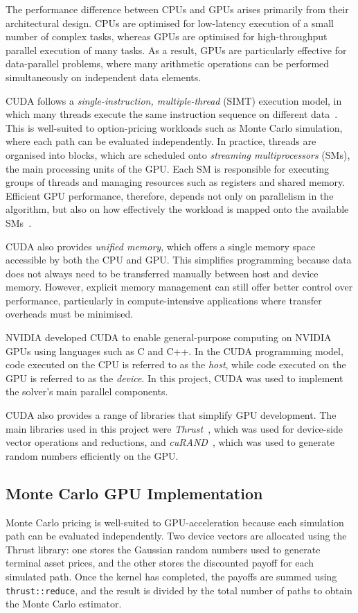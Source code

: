 \documentclass[11pt]{report}
\begin{document}
The performance difference between CPUs and GPUs arises primarily from their architectural design. 
CPUs are optimised for low-latency execution of a small number of complex tasks, 
whereas GPUs are optimised for high-throughput parallel execution of many tasks. 
As a result, GPUs are particularly effective for data-parallel problems, 
where many arithmetic operations can be performed simultaneously on independent data elements.

CUDA follows a \textit{single-instruction, multiple-thread} (SIMT) execution model, 
in which many threads execute the same instruction sequence on different data~\cite{5446251}. 
This is well-suited to option-pricing workloads such as Monte Carlo simulation, 
where each path can be evaluated independently. In practice, threads are organised into blocks,
which are scheduled onto \textit{streaming multiprocessors} (SMs), the main processing units of the GPU.
Each SM is responsible for executing groups of threads and managing resources such as registers and shared memory. 
Efficient GPU performance, therefore, depends not only on parallelism in the algorithm, 
but also on how effectively the workload is mapped onto the available SMs~\cite{4626815}.

CUDA also provides \textit{unified memory}, which offers a
single memory space accessible by both the CPU and GPU. 
This simplifies programming because data does not always 
need to be transferred manually between host and device memory. 
However, explicit memory management can still offer better control over performance, 
particularly in compute-intensive applications where transfer overheads must be minimised.

NVIDIA developed CUDA to enable general-purpose computing on NVIDIA GPUs using languages such as C and C++. 
In the CUDA programming model, code executed on the CPU is referred to as the \textit{host}, 
while code executed on the GPU is referred to as the \textit{device}. 
In this project, CUDA was used to implement the solver's main parallel components.

CUDA also provides a range of libraries that simplify GPU development. 
The main libraries used in this project were \textit{Thrust}~\cite{nvidia-thrust}, 
which was used for device-side vector operations and reductions, and \textit{cuRAND}~\cite{nvidia-curand-host-api}, 
which was used to generate random numbers efficiently on the GPU.


\subsection{Monte Carlo GPU Implementation}
Monte Carlo pricing is well-suited to GPU-acceleration because each simulation path can be evaluated independently. 
Two device vectors are allocated using the Thrust library: 
one stores the Gaussian random numbers used to generate terminal asset prices,
and the other stores the discounted payoff for each simulated path. 
Once the kernel has completed,
the payoffs are summed using \texttt{thrust::reduce}, and the result 
is divided by the total number of paths to obtain the Monte Carlo estimator.
\end{document}
